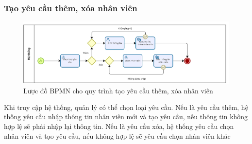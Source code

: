 \subsubsection*{Tạo yêu cầu thêm, xóa nhân viên}
\begin{figure}[!htp]
	\centering
	\includegraphics[width=14cm]{img/BPMN/Hien/Employee_request.png}
	\newline
	\caption{Lược đồ BPMN cho quy trình tạo yêu cầu thêm, xóa nhân viên}
\end{figure}

Khi truy cập hệ thống, quản lý có thể chọn loại yêu cầu. Nếu là yêu cầu thêm, hệ thống yêu cầu nhập thông tin nhân viên mới và tạo yêu cầu, nếu thông tin không hợp lệ sẽ phải nhập lại thông tin. Nếu là yêu cầu xóa, hệ thống yêu cầu chọn nhân viên và tạo yêu cầu, nếu không hợp lệ sẽ yêu cầu chọn nhân viên khác